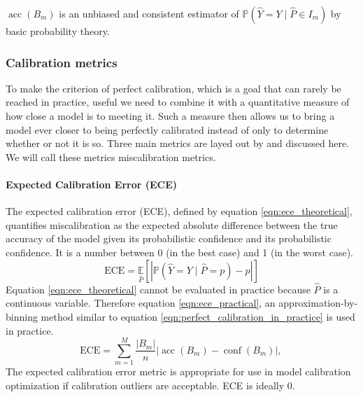 $\operatorname{acc}\left(B_{m}\right)$ is an unbiased and consistent estimator of $\mathbb{P}\left(\hat{Y}=Y \mid \hat{P} \in I_{m}\right)$ by basic probability theory.

\subsubsection{Calibration metrics}
To make the criterion of perfect calibration, which is a goal that can rarely be reached in practice, useful we need to combine it with a quantitative measure of how close a model is to meeting it. Such a measure then allows us to bring a model ever closer to being perfectly calibrated instead of only to determine whether or not it is so. Three main metrics are layed out by \cite{guo2017calibration} and discussed here. We will call these metrics miscalibration metrics.

\paragraph{Expected Calibration Error (ECE)}
The expected calibration error (ECE), defined by equation \ref{eqn:ece_theoretical}, quantifies miscalibration as the expected absolute difference between the true accuracy of the model given its probabilistic confidence and its probabilistic confidence. It is a number between 0 (in the best case) and 1 (in the worst case).
\begin{equation}
  \label{eqn:ece_theoretical}
  \mathrm{ECE}=\underset{\hat{P}}{\mathbb{E}}[|\mathbb{P}(\hat{Y}=Y \mid \hat{P}=p)-p|]
\end{equation}
Equation \ref{eqn:ece_theoretical} cannot be evaluated in practice because $\hat{P}$ is a continuous variable. Therefore equation \ref{eqn:ece_practical}, an approximation-by-binning method similar to equation \ref{eqn:perfect_calibration_in_practice} is used in practice.
\begin{equation}
  \label{eqn:ece_practical}
  \mathrm{ECE}=\sum_{m=1}^{M} \frac{\left|B_{m}\right|}{n}\left|\operatorname{acc}\left(B_{m}\right)-\operatorname{conf}\left(B_{m}\right)\right| \text {, }
\end{equation}
The expected calibration error metric is appropriate for use in model calibration optimization if calibration outliers are acceptable. ECE is ideally 0.

